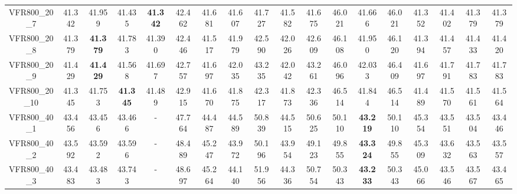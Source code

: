 \begin{tabular}{cc|ccc|ccccccccccccc}
VFR800\_20\_7      & 41.342           & 41.959           & 41.435           & {\bf 41.342}     & 42.462           & 41.681           & 41.607           & 41.727           & 41.582           & 41.675           & 46.021           & 41.666           & 46.021           & 41.352           & 41.402           & 41.379           & 41.379          \\ 
VFR800\_20\_8      & 41.379           & {\bf 41.379}     & 41.783           & 41.390           & 42.446           & 41.517           & 41.979           & 42.590           & 42.026           & 42.609           & 46.108           & 41.950           & 46.120           & 41.394           & 41.457           & 41.433           & 41.420          \\ 
VFR800\_20\_9      & 41.429           & {\bf 41.429}     & 41.568           & 41.697           & 42.757           & 41.697           & 42.035           & 43.235           & 42.042           & 43.261           & 46.096           & 42.033           & 46.409           & 41.697           & 41.791           & 41.783           & 41.783          \\ 
VFR800\_20\_10     & 41.345           & 41.753           & {\bf 41.345}     & 41.489           & 42.915           & 41.670           & 41.875           & 42.317           & 41.873           & 42.336           & 46.514           & 41.844           & 46.514           & 41.489           & 41.570           & 41.561           & 41.564          \\ 
VFR800\_40\_1      & 43.456           & 43.456           & 43.466           & -                & 47.764           & 44.487           & 44.589           & 50.839           & 44.515           & 50.625           & 50.110           & {\bf 43.219}     & 50.110           & 45.354           & 43.551           & 43.504           & 43.446          \\ 
VFR800\_40\_2      & 43.592           & 43.592           & 43.596           & -                & 48.489           & 45.247           & 43.972           & 50.196           & 43.954           & 49.123           & 49.855           & {\bf 43.324}     & 49.855           & 45.309           & 43.632           & 43.563           & 43.557          \\ 
VFR800\_40\_3      & 43.483           & 43.483           & 43.743           & -                & 48.697           & 45.264           & 44.140           & 51.956           & 44.336           & 50.754           & 50.343           & {\bf 43.233}     & 50.343           & 45.066           & 43.546           & 43.567           & 43.465          \\ 

\end{tabular}
